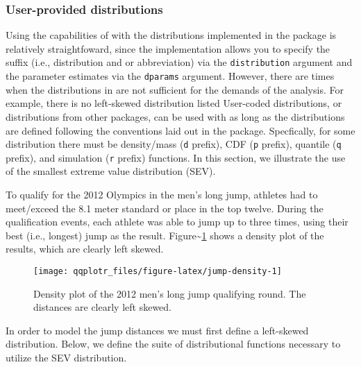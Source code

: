 \FloatBarrier

\subsubsection{User-provided
distributions}\label{user-provided-distributions}

\label{sec:user-dists}

Using the capabilities of  with the distributions
implemented in the  package is relatively straightfoward,
since the implementation allows you to specify the suffix (i.e.,
distribution and or abbreviation) via the \texttt{distribution} argument
and the parameter estimates via the \texttt{dparams} argument. However,
there are times when the distributions in  are not sufficient
for the demands of the analysis. For example, there is no left-skewed
distribution listed
User-coded distributions, or distributions from other packages, can be
used with  as long as the distributions are defined
following the conventions laid out in the  package.
Specfically, for some distribution there must be density/mass
(\texttt{d} prefix), CDF (\texttt{p} prefix), quantile (\texttt{q}
prefix), and simulation (\texttt{r} prefix) functions. In this section,
we illustrate the use of the smallest extreme value distribution (SEV).

To qualify for the 2012 Olympics in the men's long jump, athletes had to
meet/exceed the 8.1 meter standard or place in the top twelve. During
the qualification events, each athlete was able to jump up to three
times, using their best (i.e., longest) jump as the result.
Figure\textasciitilde{}\ref{fig:jump-density} shows a density plot of
the results, which are clearly left skewed.

\begin{Schunk}
\begin{figure}

{\centering \texttt{[image: qqplotr\_files/figure-latex/jump-density-1]} 

}

\caption[Density plot of the 2012 men's long jump qualifying round]{Density plot of the 2012 men's long jump qualifying round. The distances are clearly left skewed.}\label{fig:jump-density}
\end{figure}
\end{Schunk}

In order to model the jump distances we must first define a left-skewed
distribution. Below, we define the suite of distributional functions
necessary to utilize the SEV distribution.

